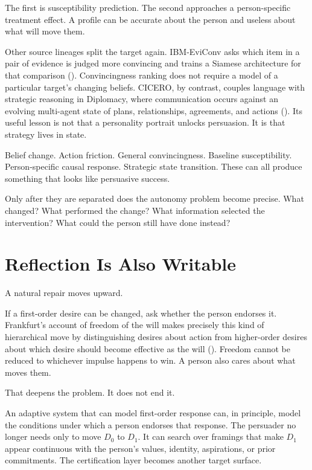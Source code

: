 \documentclass[
  10.5pt,
  letterpaper,
]{article}
\begin{document}
The first is susceptibility prediction. The second approaches a
person-specific treatment effect. A profile can be accurate about the
person and useless about what will move them.

Other source lineages split the target again. IBM-EviConv asks which
item in a pair of evidence is judged more convincing and trains a
Siamese architecture for that comparison
(). Convincingness
ranking does not require a model of a particular target's changing
beliefs. CICERO, by contrast, couples language with strategic reasoning
in Diplomacy, where communication occurs against an evolving multi-agent
state of plans, relationships, agreements, and actions
(). Its useful lesson is not that a personality portrait
unlocks persuasion. It is that strategy lives in state.

Belief change. Action friction. General convincingness. Baseline
susceptibility. Person-specific causal response. Strategic state
transition. These can all produce something that looks like persuasive
success.

Only after they are separated does the autonomy problem become precise.
What changed? What performed the change? What information selected the
intervention? What could the person still have done instead?

\section{Reflection Is Also Writable}\label{reflection-is-also-writable}

A natural repair moves upward.

If a first-order desire can be changed, ask whether the person endorses
it. Frankfurt's account of freedom of the will makes precisely this kind
of hierarchical move by distinguishing desires about action from
higher-order desires about which desire should become effective as the
will (). Freedom
cannot be reduced to whichever impulse happens to win. A person also
cares about what moves them.

That deepens the problem. It does not end it.

An adaptive system that can model first-order response can, in
principle, model the conditions under which a person endorses that
response. The persuader no longer needs only to move \(D_0\) to \(D_1\).
It can search over framings that make \(D_1\) appear continuous with the
person's values, identity, aspirations, or prior commitments. The
certification layer becomes another target surface.
\end{document}
